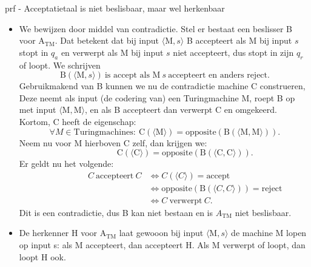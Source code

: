 \begin{prf}{prf - Acceptatietaal is niet beslisbaar, maar wel herkenbaar}
    \begin{itemize}
        \item 
            We bewijzen door middel van contradictie. Stel er bestaat een beslisser B voor A$_{\text{TM}}$. Dat betekent dat bij input $\langle \text{M},s \rangle$ B accepteert als M bij input $s$ stopt in $q_a$ en verwerpt als M bij input $s$ niet accepteert, dus stopt in zijn $q_r$ of loopt. We schrijven
            \begin{equation*}
                \text{B}(\langle \text{M},s \rangle) \ \text{is accept als M} \ s \ \text{accepteert en anders reject}.
            \end{equation*}
            Gebruikmakend van B kunnen we nu de contradictie machine C construeren, Deze neemt als input (de codering van) een Turingmachine M, roept B op met input $\langle \text{M}, \text{M} \rangle$, en als B accepteert dan verwerpt C en omgekeerd. Kortom, C heeft de eigenschap:
            \begin{equation*}
                \forall M \in \text{Turingmachines}: \ \text{C}(\langle \text{M} \rangle) = \text{opposite}(\text{B}(\langle \text{M}, \text{M} \rangle)).
            \end{equation*}
            Neem nu voor M hierboven C zelf, dan krijgen we:
            \begin{equation*}
                \hspace{2cm}\text{C}(\langle \text{C} \rangle) = \text{opposite}(\text{B}(\langle \text{C}, \text{C} \rangle)).
            \end{equation*}
            Er geldt nu het volgende:
            \begin{align*}
                \hspace{2cm}
                C \ \text{accepteert} \ C 
                    &\Leftrightarrow C(\langle C \rangle) = \text{accept} \\
                    &\Leftrightarrow \text{opposite}(\text{B}(\langle C, C \rangle)) = \text{reject} \\
                    &\Leftrightarrow C \ \text{verwerpt} \ C.
            \end{align*}
            Dit is een contradictie, dus B kan niet bestaan en is $A_{\text{TM}}$ niet beslisbaar.
        \item 
            De herkenner H voor A$_{\text{TM}}$ laat gewooon bij input $\langle \text{M},s \rangle$ de machine M lopen op input s: als M accepteert, dan accepteert H. Als M verwerpt of loopt, dan loopt H ook.
    \end{itemize}
    \vspace{-0.3cm}
\end{prf}

